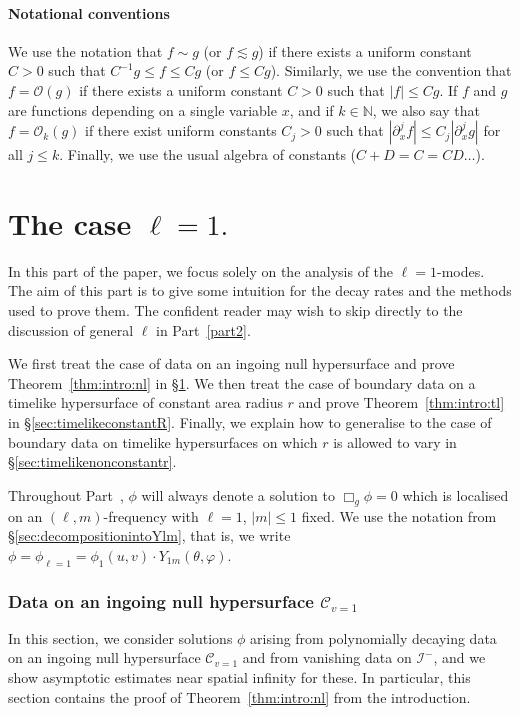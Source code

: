 \documentclass[11pt,english]{article}
\numberwithin{equation}{section}
\theoremstyle{remark}
\theoremstyle{plain}
\theoremstyle{remark}
\renewcommand{\(}{\left(}
\renewcommand{\)}{\right)}
\begin{document}
\subsection{Notational conventions}

We use the notation that $f\sim g$ (or $f\lesssim g$) if there exists a uniform constant $C>0$ such that $C^{-1}g\leq f\leq Cg$ (or $f\leq C g$). Similarly, we use the convention that $f=\mathcal O(g)$ if there exists a uniform constant $C>0$ such that $|f|\leq C g$. If $f$ and $g$ are functions depending on a single variable $x$, and if $k\in\mathbb N$, we also say that $f=\mathcal O_k(g)$ if there exist uniform constants $C_j>0$ such that $|\partial_x^j f|\leq C_j|\partial_x^j g|$ for all $j\leq k$.
 Finally, we use the usual algebra of constants ($C+D=C=CD\dots$).



\newpage
\part{The case \texorpdfstring{$\ell=1.$}{L=1.}}\label{part1}
In this part of the paper, we focus solely on the analysis of the $\ell=1$-modes. 
The aim of this part is to give some intuition for the decay rates and the methods used to prove them. 
The confident reader may wish to skip directly to the discussion of general $\ell$ in Part~\ref{part2}.

We first treat the case of data on an ingoing null hypersurface and prove Theorem~\ref{thm:intro:nl} in \S \ref{sec:nl}. 
We then treat the case of boundary data on a timelike hypersurface of constant area radius $r$ and prove Theorem~\ref{thm:intro:tl} in \S \ref{sec:timelikeconstantR}. 
Finally, we explain how to generalise to the case of boundary data on timelike hypersurfaces on which $r$ is allowed to vary in \S \ref{sec:timelikenonconstantr}.

Throughout Part~\ref{part1}, $\phi$ will always denote a solution to $\Box_g\phi=0$ which is localised on an $(\ell,m)$-frequency with $\ell=1$, $|m|\leq 1$ fixed. We use the notation from \S\ref{sec:decompositionintoYlm}, that is, we write $\phi=\phi_{\ell=1}=\phi_1(u,v)\cdot Y_{1m}(\theta,\varphi)$.
\section{Data on an ingoing null hypersurface \texorpdfstring{$\mathcal C_{v=1}$}{C(v=1)}}\label{sec:nl}
In this section, we consider solutions $\phi$ arising from polynomially decaying data on an ingoing null hypersurface $\mathcal{C}_{v=1}$ and from vanishing data on $\mathcal I^-$, and we show asymptotic estimates near spatial infinity for these. In particular, this section contains the proof of Theorem~\ref{thm:intro:nl} from the introduction.
\end{document}
